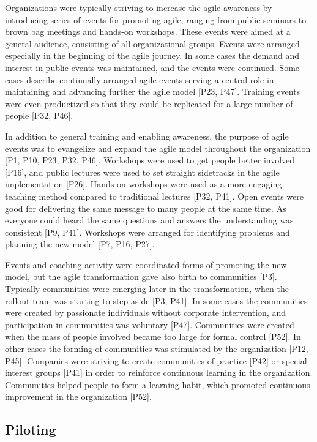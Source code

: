 Organizations were typically striving to increase the agile awareness by introducing
series of events for promoting agile, ranging from public seminars to brown bag
meetings and hands-on workshops. These events were aimed at a general audience,
consisting of all organizational groups. Events were arranged especially in the
beginning of the agile journey. In some cases the demand and interest in public
events was maintained, and the events were continued.
Some cases describe continually arranged agile events serving a central role in
maintaining and advancing further the agile model [P23, P47].
Training events were even productized so that they could be replicated for a
large number of people [P32, P46].

In addition to general training and enabling awareness, the purpose of agile
events was to evangelize and expand the agile model throughout the organization
[P1, P10, P23, P32, P46].
Workshops were used to get people better involved [P16], and public lectures
were used to set straight sidetracks in the agile implementation [P26].
Hands-on workshops were used as a more engaging teaching method compared to
traditional lectures [P32, P41]. Open events were good for delivering the same
message to many people at the same time. As everyone could heard the same
questions and answers the understanding was consistent [P9, P41].
Workshops were arranged for identifying problems and planning the new model [P7,
P16, P27].



Events and coaching activity were coordinated forms of promoting the new model,
but the agile transformation gave also birth to communities [P3]. Typically
communities were emerging later in the transformation, when the rollout team
was starting to step aside [P3, P41].
In some cases the communities were created by passionate individuals without
corporate intervention, and participation in communities was voluntary [P47].
Communities were created when the mass of people involved became too large for
formal control [P52].
In other cases the forming of communities was stimulated by the organization
[P12, P45].
Companies were striving to create communities of practice [P42] or special interest
groups [P41] in order to reinforce continuous learning in the organization.
Communities helped people to form a learning habit, which promoted continuous
improvement in the organization [P52].


\subsection{Piloting}

